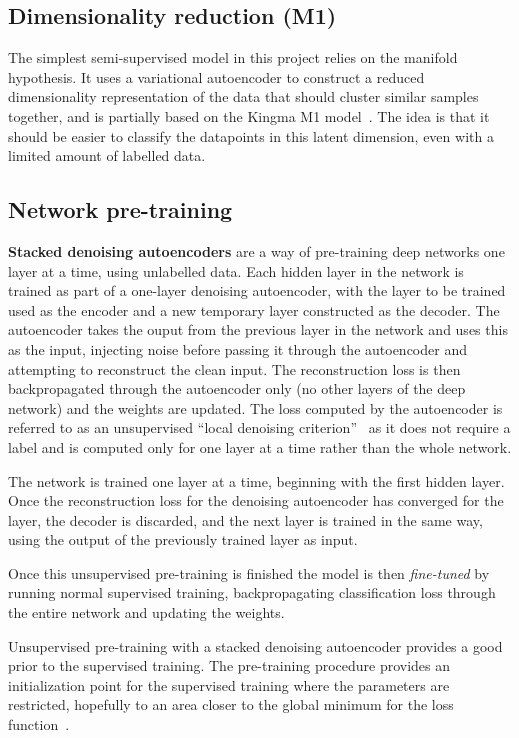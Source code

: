 \subsection{Dimensionality reduction (M1)} \label{m1}

The simplest semi-supervised model in this project relies on the manifold hypothesis. It uses a variational autoencoder to construct a
reduced dimensionality representation of the data that should cluster similar samples together, and is partially based 
on the Kingma M1 model~\cite{DBLP:journals/corr/KingmaRMW14}. The idea is that it should be 
easier to classify the datapoints in this latent dimension, even with a limited amount of labelled data.

\subsection{Network pre-training} \label{sdae}

\textbf{Stacked denoising autoencoders} are a way of pre-training deep networks one layer at a time, using unlabelled data. 
Each hidden layer in the network is 
trained as part of a one-layer denoising autoencoder, with the layer to be trained used as the encoder and a new temporary layer constructed
as the decoder. The autoencoder takes the ouput from the previous layer in the network and uses this as the input, injecting noise before 
passing it through the autoencoder and attempting to reconstruct the clean input. The reconstruction loss is then backpropagated through 
the autoencoder only (no other layers of the deep network) and the weights are updated. The loss computed by the autoencoder is referred to 
as an unsupervised ``local denoising criterion''~\cite{Vincent:2010:SDA:1756006.1953039} as it does not require a label and is computed only 
for one layer at a time rather than the whole network.

The network is trained one layer at a time, beginning with the first hidden layer. Once the reconstruction loss for the denoising autoencoder has 
converged for the layer, the decoder is discarded, and the next layer is trained in the same way, using the output of the previously trained
layer as input.

Once this unsupervised pre-training is finished the model is then \textit{fine-tuned} by running normal supervised training, backpropagating
classification loss through the entire network and updating the weights.

Unsupervised pre-training with a stacked denoising autoencoder provides a good prior to the supervised training.
The pre-training procedure provides an initialization point for the supervised training where the parameters are restricted, hopefully to an area 
closer to the global minimum for the loss function~\cite{Erhan:2010:WUP:1756006.1756025}.

